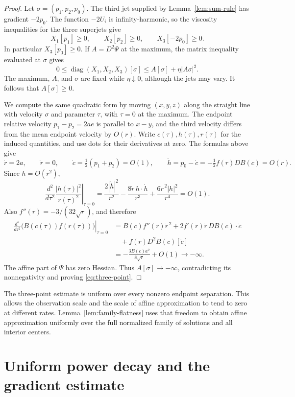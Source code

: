 \documentclass[11pt]{article}
\numberwithin{equation}{section}
\theoremstyle{definition}
\theoremstyle{remark}
\begin{document}
\begin{proof}
Let $\sigma=(p_1,p_2,p_0)$. The third jet supplied by Lemma~\ref{lem:sum-rule} has gradient $-2p_0$. The function $-2U_i$ is infinity-harmonic, so the viscosity inequalities for the three superjets give
\[
  X_1[p_1]\ge0,\qquad X_2[p_2]\ge0,\qquad X_3[-2p_0]\ge0.
\]
In particular $X_3[p_0]\ge0$. If $A=D^2\Psi$ at the maximum, the matrix inequality evaluated at $\sigma$ gives
\[
  0\le\operatorname{diag}(X_1,X_2,X_3)[\sigma]
       \le A[\sigma]+\eta|A\sigma|^2.
\]
The maximum, $A$, and $\sigma$ are fixed while $\eta\downarrow0$, although the jets may vary. It follows that $A[\sigma]\ge0$.

We compute the same quadratic form by moving $(x,y,z)$ along the straight line with velocity $\sigma$ and parameter $\tau$, with $\tau=0$ at the maximum. The endpoint relative velocity $p_1-p_2=2ae$ is parallel to $x-y$, and the third velocity differs from the mean endpoint velocity by $O(r)$. Write $c(\tau),h(\tau),r(\tau)$ for the induced quantities, and use dots for their derivatives at zero. The formulas above give
\[
  \dot r=2a,\qquad \ddot r=0,\qquad
  \dot c=\tfrac12(p_1+p_2)=O(1),\qquad
  \dot h=p_0-\dot c=-\tfrac12f(r)DB(c)=O(r).
\]
Since $h=O(r^2)$,
\[
  \left.\frac{d^2}{d\tau^2}\frac{|h(\tau)|^2}{r(\tau)^2}\right|_{\tau=0}
  =\frac{2|\dot h|^2}{r^2}
   -\frac{8\dot r\,h\cdot\dot h}{r^3}
   +\frac{6\dot r^{\,2}|h|^2}{r^4}=O(1).
\]
Also $f''(r)=-3/(32\sqrt r)$, and therefore
\begin{align*}
  \left.\frac{d^2}{d\tau^2}\bigl(B(c(\tau))f(r(\tau))\bigr)\right|_{\tau=0}
  &=B(c)f''(r)\dot r^{\,2}+2f'(r)\dot r\,DB(c)\cdot\dot c\\
  &\quad+f(r)D^2B(c)[\dot c]\\
  &=-\frac{3B(c)a^2}{8\sqrt r}+O(1)\longrightarrow-\infty.
\end{align*}
The affine part of $\Psi$ has zero Hessian. Thus $A[\sigma]\to-\infty$, contradicting its nonnegativity and proving \eqref{eq:three-point}.
\end{proof}

The three-point estimate is uniform over every nonzero endpoint separation.
This allows the observation scale and the scale of affine approximation
to tend to zero at different rates. Lemma~\ref{lem:family-flatness} uses
that freedom to obtain affine approximation uniformly over the full
normalized family of solutions and all interior centers.

\section{Uniform power decay and the gradient estimate}\label{sec:reduction}
\end{document}
